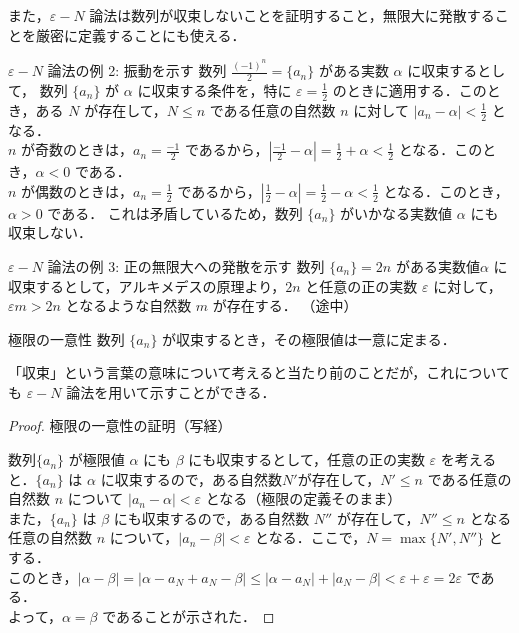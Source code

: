 \documentclass[a4paper]{ltjsarticle}
\begin{document}
 また，$\varepsilon - N$ 論法は数列が収束しないことを証明すること，無限大に発散することを厳密に定義することにも使える．
  \begin{tcb}{$ \varepsilon - N$ 論法の例 2: 振動を示す}{}
   数列 $\frac{(-1)^n}{2} = \{a_n\}$ がある実数 $\alpha$ に収束するとして，
   数列 $\{a_n\}$ が $\alpha$ に収束する条件を，特に $\varepsilon = \frac{1}{2}$ のときに適用する．このとき，ある $N$ が存在して，$N \leq n$ である任意の自然数 $n$ に対して $|a_n - \alpha| < \frac{1}{2}$ となる．
   \\
   $n$ が奇数のときは，$a_n = \frac{-1}{2}$ であるから，$|\frac{-1}{2} - \alpha| = \frac{1}{2} + \alpha < \frac{1}{2}$ となる．このとき，$\alpha < 0$ である．
   \\
   $n$ が偶数のときは，$a_n = \frac{1}{2}$ であるから，$|\frac{1}{2} - \alpha| = \frac{1}{2} - \alpha < \frac{1}{2}$ となる．このとき，$\alpha > 0$ である．
   これは矛盾しているため，数列 $\{a_n\}$ がいかなる実数値 $\alpha$ にも収束しない．

  \end{tcb}

   \begin{tcb}{$ \varepsilon - N$ 論法の例 3: 正の無限大への発散を示す}{}
    数列 $\{a_n\} = 2n$ がある実数値$ \alpha$ に収束するとして，アルキメデスの原理より，$2n$ と任意の正の実数 $\varepsilon$ に対して，$\varepsilon m > 2n$ となるような自然数 $m$ が存在する． （途中）

   \end{tcb}

  \begin{theorem}{極限の一意性}{}
   数列 $\{a_n\}$ が収束するとき，その極限値は一意に定まる．
  \end{theorem}

「収束」という言葉の意味について考えると当たり前のことだが，これについても $\varepsilon - N$ 論法を用いて示すことができる．

\pagebreak

 \begin{proof}{極限の一意性の証明（写経）}{}

  数列$\{a_n\}$ が極限値 $\alpha$ にも $\beta$ にも収束するとして，任意の正の実数 $\varepsilon$ を考えると．$\{a_n\}$ は $\alpha$ に収束するので，ある自然数$N'$が存在して，$N' \leq n$ である任意の自然数 $n$ について $|a_n - \alpha| < \varepsilon$ となる（極限の定義そのまま）
  \\
  また，$\{a_n\}$ は $\beta$ にも収束するので，ある自然数 $N''$ が存在して，$N'' \leq  n$ となる任意の自然数 $n$ について，$|a_n - \beta| < \varepsilon$ となる．ここで，$N = \max \{ N', N''\}$ とする．
  \\
  このとき，$|\alpha - \beta| = |\alpha - a_N + a_N - \beta| \leq |\alpha - a_N| + |a_N - \beta| < \varepsilon + \varepsilon = 2\varepsilon$ である．
  \\
  よって，$\alpha = \beta$ であることが示された．

 \end{proof}
\end{document}
